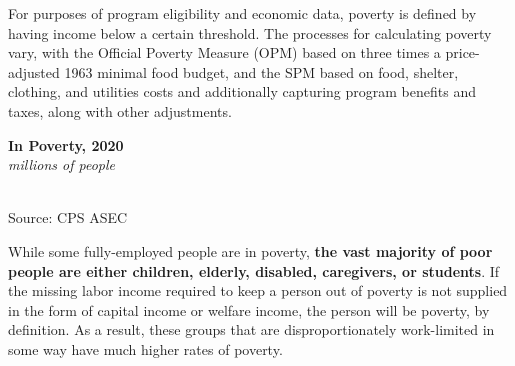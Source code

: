\documentclass{report}
\newcommand{\barylab}[2]{yticklabel style={text width=#1, align=right, 
		style={black!70}, text height=#2},}
\newcommand{\bbar}[2]{extra #1 ticks = {{#2}}, extra #1 tick labels = ,
		extra #1 tick style = {grid=major, grid style={thick, black!25}},}
\newcommand{\barplotnogrid}{xbar=0pt, axis line style={draw=none},
	    yticklabel style={align=left, anchor=east},
      		xmajorticks=false, ymajorgrids=false,   
	    ytick=data, tickwidth=0pt, area legend, reverse legend,
	    nodes near coords, nodes near coords align={horizontal},}
\begin{document}
{\begin{minipage}{0.76\textwidth}
For purposes of program eligibility and economic data, poverty is defined by having income below a certain threshold. The processes for calculating poverty vary, with the Official Poverty Measure (OPM) based on three times a price-adjusted 1963 minimal food budget, and the SPM based on food, shelter, clothing, and utilities costs and additionally capturing program benefits and taxes, along with other adjustments.
\end{minipage} \hspace{6mm}
\begin{minipage}{0.24\textwidth}
\normalsize \textbf{In Poverty, 2020}\\
\footnotesize{\textit{millions of people}}\\
  \hspace*{-4mm} \\
\footnotesize{Source: CPS ASEC}
\vfill
\end{minipage}
\vspace{1mm}

\begin{minipage}{0.76\textwidth}
\small While some fully-employed people are in poverty, \textbf{the vast majority of poor people are either children, elderly, disabled, caregivers, or students}.  If the missing labor income required to keep a person out of poverty is not supplied in the form of capital income or welfare income, the person will be poverty, by definition. As a result, these groups that are disproportionately work-limited in some way have much higher rates of poverty. 
\vspace{1mm}


\end{minipage}}
\end{document}
